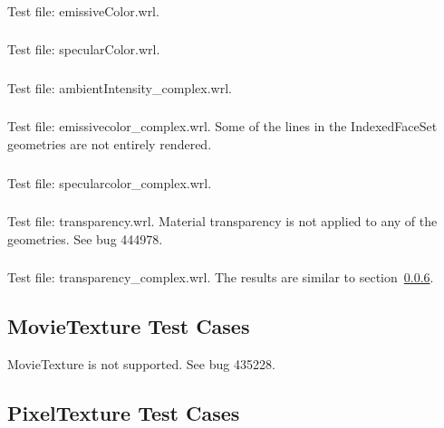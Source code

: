 \subsubsection{\MatW}
\label{sec:mat-emissive}
Test file: emissiveColor.wrl.

\subsubsection{\MatX}
Test file: specularColor.wrl.

\subsubsection{\MatY}
\label{sec:amb-intensity-complex}
Test file: ambientIntensity\_complex.wrl.

\subsubsection{\MatZ}
Test file: emissivecolor\_complex.wrl.\newline
Some of the lines in the IndexedFaceSet geometries are not entirely rendered.

\subsubsection{\MatAA}
Test file: specularcolor\_complex.wrl.

\subsubsection{\MatAB}
\label{sec:mat-transparency}
Test file: transparency.wrl.\newline
Material transparency is not applied to any of the geometries.
See bug 444978.

\subsubsection{\MatAC}
Test file: transparency\_complex.wrl.\newline
The results are similar to section~\ref{sec:mat-transparency}.

\subsection{MovieTexture Test Cases}
MovieTexture is not supported.
See bug 435228.

\subsection{PixelTexture Test Cases}

